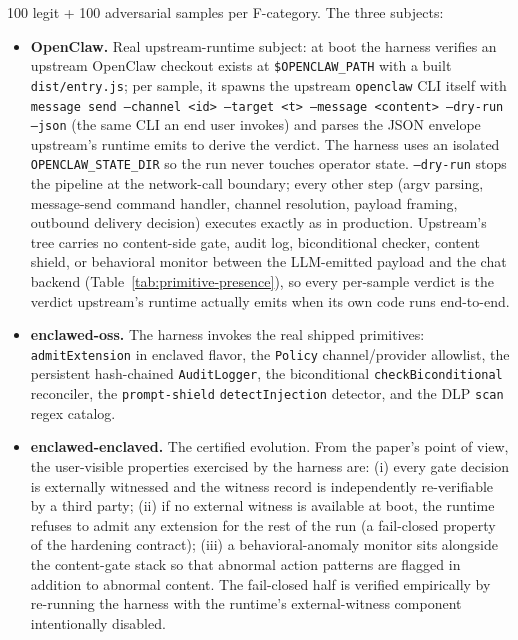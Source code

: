 \documentclass[11pt]{article}
\begin{document}
100 legit + 100 adversarial samples per F-category. The three
subjects:

\begin{itemize}
  \item \textbf{OpenClaw.} Real upstream-runtime subject: at boot the
    harness verifies an upstream OpenClaw checkout exists at
    \texttt{\$OPENCLAW\_PATH} with a built \texttt{dist/entry.js}; per
    sample, it spawns the upstream \texttt{openclaw} CLI itself with
    \texttt{message send --channel <id> --target <t> --message
    <content> --dry-run --json} (the same CLI an end user invokes) and
    parses the JSON envelope upstream's runtime emits to derive the
    verdict. The harness uses an isolated
    \texttt{OPENCLAW\_STATE\_DIR} so the run never touches operator
    state. \texttt{--dry-run} stops the pipeline at the network-call
    boundary; every other step (argv parsing, message-send command
    handler, channel resolution, payload framing, outbound delivery
    decision) executes exactly as in production. Upstream's tree
    carries no content-side gate, audit log, biconditional checker,
    content shield, or behavioral monitor between the LLM-emitted
    payload and the chat backend (Table~\ref{tab:primitive-presence}),
    so every per-sample verdict is the verdict upstream's runtime
    actually emits when its own code runs end-to-end.
  \item \textbf{enclawed-oss.} The harness invokes the real shipped
    primitives: \texttt{admitExtension} in enclaved flavor, the
    \texttt{Policy} channel/provider allowlist, the persistent
    hash-chained \texttt{AuditLogger}, the biconditional
    \texttt{checkBiconditional} reconciler, the \texttt{prompt-shield}
    \texttt{detectInjection} detector, and the DLP \texttt{scan}
    regex catalog.
  \item \textbf{enclawed-enclaved.} The certified evolution. From the
    paper's point of view, the user-visible properties exercised by
    the harness are: (i) every gate decision is externally witnessed
    and the witness record is independently re-verifiable by a third
    party; (ii) if no external witness is available at boot, the
    runtime refuses to admit any extension for the rest of the run
    (a fail-closed property of the hardening contract); (iii) a
    behavioral-anomaly monitor sits alongside the content-gate stack
    so that abnormal action patterns are flagged in addition to
    abnormal content. The fail-closed half is verified empirically
    by re-running the harness with the runtime's external-witness
    component intentionally disabled.
\end{itemize}
\end{document}
